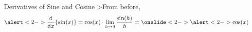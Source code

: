 \begin{frame}[t]{Derivatives of Sine and Cosine}
>From before,
\[\alert<2->{\diff{}{x}\{\sin(x)\}} = \cos(x)\cdot \lim_{h \rightarrow 0 }\frac{\sin(h)}{h} = \onslide<2->{\alert<2->{\cos(x)}}\]

%
%

\end{frame}

